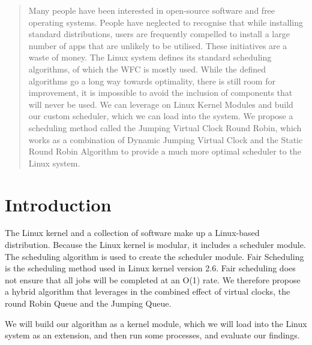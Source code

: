 \maketitle

\begin{abstract}
Many people have been interested in open-source software and free operating systems. People have neglected to recognise that while installing standard distributions, users are frequently compelled to install a large number of apps that are unlikely to be utilised. These initiatives are a waste of money. The Linux system defines its standard scheduling algorithms, of which the WFC is mostly used. While the defined algorithms go a long way towards optimality, there is still room for improvement, it is impossible to avoid the inclusion of components that will never be used. We can leverage on Linux Kernel Modules and build our custom scheduler, which we can load into the system. We propose a scheduling method called the Jumping Virtual Clock Round Robin, which works as a combination of Dynamic Jumping Virtual Clock and the Static Round Robin Algorithm to provide a much more optimal scheduler to the Linux system.

\end{abstract}


\section{Introduction}

The Linux kernel and a collection of software make up a Linux-based distribution. Because the Linux kernel is modular, it includes a scheduler module. The scheduling algorithm is used to create the scheduler module. Fair Scheduling is the scheduling method used in Linux kernel version 2.6. Fair scheduling does not ensure that all jobs will be completed at an O(1) rate. We therefore propose a hybrid algorithm that leverages in the combined effect of virtual clocks, the round Robin Queue and the Jumping Queue.~\cite{alireza23} 

We will build our algorithm as a kernel module, which we will load into the Linux system as an extension, and then run some processes, and evaluate our findings.

